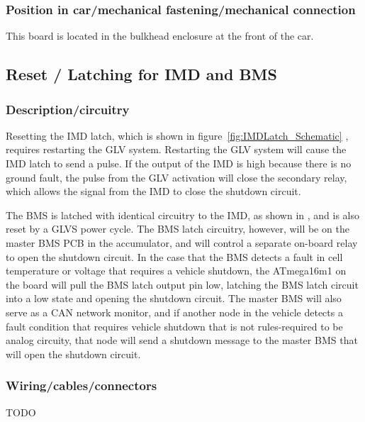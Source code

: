 \documentclass{article}
\begin{document}
\subsubsection{Position in car/mechanical fastening/mechanical connection}

This board is located in the bulkhead enclosure at the front of the car.

\subsection{Reset / Latching for IMD and BMS}\label{reset_latching_for_imd_and_bms}
\subsubsection{Description/circuitry}

Resetting the IMD latch, which is shown in figure~\ref{fig:IMDLatch_Schematic} , requires restarting the GLV system. Restarting the GLV system will cause the IMD latch to send a pulse. If the output of the IMD is high because there is no ground fault, the pulse from the GLV activation will close the secondary relay, which allows the signal from the IMD to close the shutdown circuit.

The BMS is latched with identical circuitry to the IMD, as shown in , and is also reset by a GLVS power cycle. The BMS latch circuitry, however, will be on the master BMS PCB in the accumulator, and will control a separate on-board relay to open the shutdown circuit. In the case that the BMS detects a fault in cell temperature or voltage that requires a vehicle shutdown, the ATmega16m1 on the board will pull the BMS latch output pin low, latching the BMS latch circuit into a low state and opening the shutdown circuit. The master BMS will also serve as a CAN network monitor, and if another node in the vehicle detects a fault condition that requires vehicle shutdown that is not rules-required to be analog circuity, that node will send a shutdown message to the master BMS that will open the shutdown circuit. 

\subsubsection{Wiring/cables/connectors}
TODO
\end{document}

